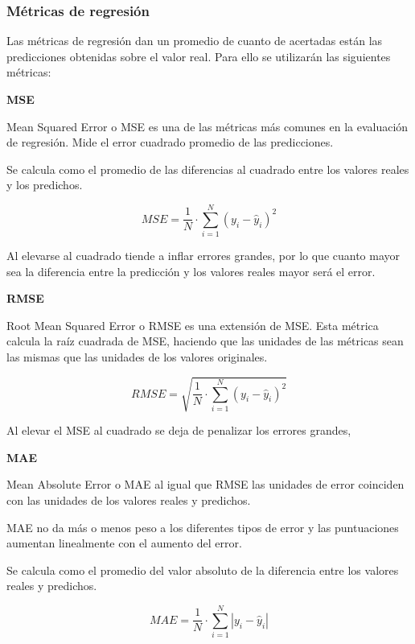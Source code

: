 \subsubsection{Métricas de regresión}

Las métricas de regresión dan un promedio de cuanto de acertadas están las predicciones obtenidas sobre el valor real. Para ello se utilizarán las siguientes métricas:

\textbf{MSE}

Mean Squared Error o MSE es una de las métricas más comunes en la evaluación de regresión. Mide el error cuadrado promedio de las predicciones.

Se calcula como el promedio de las diferencias al cuadrado entre los valores reales y los predichos.

\begin{equation*}
    MSE = \frac{1}{N} \cdot \sum_{i=1}^{N}(y_i - \hat{y}_i)^2
\end{equation*}

Al elevarse al cuadrado tiende a inflar errores grandes, por lo que cuanto mayor sea la diferencia entre la predicción y los valores reales mayor será el error.

\textbf{RMSE}

Root Mean Squared Error o RMSE es una extensión de MSE. Esta métrica calcula la raíz cuadrada de MSE, haciendo que las unidades de las métricas sean las mismas que las unidades de los valores originales.

\begin{equation*}
    RMSE = \sqrt{\frac{1}{N} \cdot \sum_{i=1}^{N}(y_i - \hat{y}_i)^2} 
\end{equation*}

Al elevar el MSE al cuadrado se deja de penalizar los errores grandes,

\textbf{MAE}

Mean Absolute Error o MAE al igual que RMSE las unidades de error coinciden con las unidades de los valores reales y predichos.

MAE no da más o menos peso a los diferentes tipos de error y las puntuaciones aumentan linealmente con el aumento del error.

Se calcula como el promedio del valor absoluto de la diferencia entre los valores reales y predichos.

\begin{equation*}
    MAE = \frac{1}{N} \cdot \sum_{i=1}^{N}|y_i - \hat{y}_i| 
\end{equation*}


